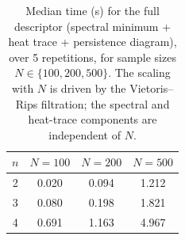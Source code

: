 \begin{table}[htbp]\centering
\caption{Median time (s) for the full descriptor
(spectral minimum + heat trace + persistence diagram), over 5 repetitions,
for sample sizes \(N\in\{100,200,500\}\). The scaling with \(N\) is driven
by the Vietoris--Rips filtration; the spectral and heat-trace components
are independent of \(N\).}
\label{tab:performance}
\begin{tabular}{cccc}\hline
\(n\) & \(N = 100\) & \(N = 200\) & \(N = 500\) \\\hline
2 & 0.020 & 0.094 & 1.212 \\
3 & 0.080 & 0.198 & 1.821 \\
4 & 0.691 & 1.163 & 4.967 \\
\hline\end{tabular}\end{table}